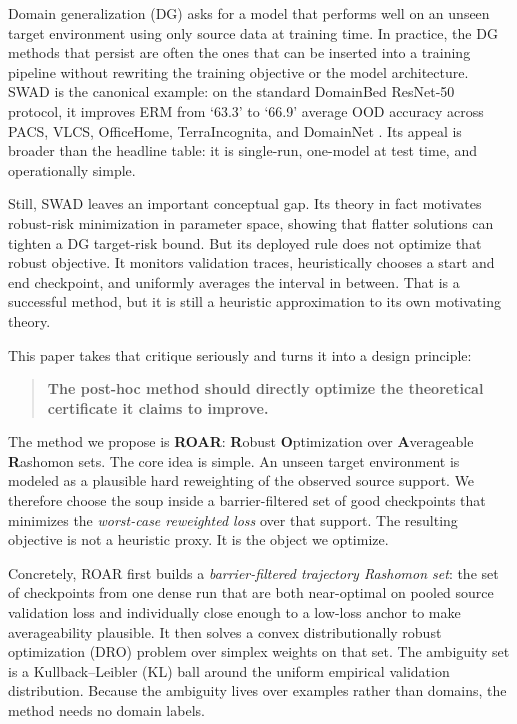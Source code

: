 \documentclass{article}
\newcommand{\ood}{OOD}
\newcommand{\roar}{\textup{\textsc{ROAR}}}
\newcommand{\swad}{\textup{\textsc{SWAD}}}
\begin{document}
Domain generalization (DG) asks for a model that performs well on an unseen target environment using only source data at training time. In practice, the DG methods that persist are often the ones that can be inserted into a training pipeline without rewriting the training objective or the model architecture. \swad{} is the canonical example: on the standard DomainBed ResNet-50 protocol, it improves ERM from `63.3' to `66.9' average \ood{} accuracy across PACS, VLCS, OfficeHome, TerraIncognita, and DomainNet \citep{cha2021swad}. Its appeal is broader than the headline table: it is single-run, one-model at test time, and operationally simple.

Still, \swad{} leaves an important conceptual gap. Its theory in fact motivates robust-risk minimization in parameter space, showing that flatter solutions can tighten a DG target-risk bound. But its deployed rule does not optimize that robust objective. It monitors validation traces, heuristically chooses a start and end checkpoint, and uniformly averages the interval in between. That is a successful method, but it is still a heuristic approximation to its own motivating theory.

This paper takes that critique seriously and turns it into a design principle:
\begin{quote}
\textbf{The post-hoc method should directly optimize the theoretical certificate it claims to improve.}
\end{quote}

The method we propose is \textbf{\roar{}}: \textbf{R}obust \textbf{O}ptimization over \textbf{A}verageable \textbf{R}ashomon sets. The core idea is simple. An unseen target environment is modeled as a plausible hard reweighting of the observed source support. We therefore choose the soup inside a barrier-filtered set of good checkpoints that minimizes the \emph{worst-case reweighted loss} over that support. The resulting objective is not a heuristic proxy. It is the object we optimize.

Concretely, \roar{} first builds a \emph{barrier-filtered trajectory Rashomon set}: the set of checkpoints from one dense run that are both near-optimal on pooled source validation loss and individually close enough to a low-loss anchor to make averageability plausible. It then solves a convex distributionally robust optimization (DRO) problem over simplex weights on that set. The ambiguity set is a Kullback--Leibler (KL) ball around the uniform empirical validation distribution. Because the ambiguity lives over examples rather than domains, the method needs no domain labels.
\end{document}
